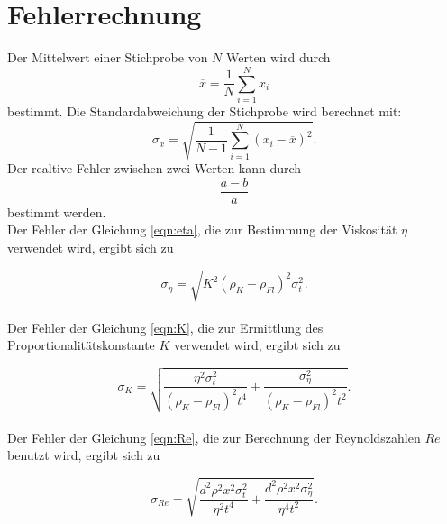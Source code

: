 \section{Fehlerrechnung}

Der Mittelwert einer Stichprobe von $N$ Werten wird durch
\begin{equation}
    \overline{x} = \frac{1}{N} \sum_{i=1}^N x_i
    \label{eqn:mittelwert}
\end{equation}
bestimmt.
\newline
Die Standardabweichung der Stichprobe wird berechnet mit:
\begin{equation}
    \sigma_x = \sqrt{\frac{1}{N-1} \sum_{i=1}^N (x_i - \overline{x})^2}.
    \label{eqn:standard}
\end{equation}
\newline
Der realtive Fehler zwischen zwei Werten kann durch
\begin{equation*}
    \frac{a-b}{a}
\end{equation*}
bestimmt werden.
\\
\noindent Der Fehler der Gleichung \ref{eqn:eta}, die zur Bestimmung der Viskosität $\eta$ verwendet wird, ergibt sich zu 

\begin{equation}
    \sigma_{\eta} = \sqrt{K^{2} \left(\rho_{K}-\rho_{Fl}\right)^{2} \sigma_{t}^{2}}.
    \label{eqn:erreta}
\end{equation}
\\
\noindent Der Fehler der Gleichung \ref{eqn:K}, die zur Ermittlung des Proportionalitätskonstante $K$ verwendet wird, ergibt sich zu 

\begin{equation}
    \sigma_{K} = \sqrt{\frac{\eta^{2} \sigma_{t}^{2}}{\left(\rho_{K}-\rho_{Fl}\right)^{2} t^{4}} + \frac{\sigma_{\eta}^{2}}{\left(\rho_{K}-\rho_{Fl}\right)^{2}t^{2}}}.
    \label{eqn:errK}
\end{equation}
\\
\noindent Der Fehler der Gleichung \ref{eqn:Re}, die zur Berechnung der Reynoldszahlen $Re$ benutzt wird, ergibt sich zu 

\begin{equation}
    \sigma_{Re} = \sqrt{\frac{d^{2} \rho^{2} x^{2} \sigma_{t}^{2} }{\eta^{2} t^{4}} + \frac{d^{2} \rho^{2} x^{2} \sigma_{\eta}^{2}}{\eta^{4} t^{2}}}.
    \label{eqn:errRe}
\end{equation}
